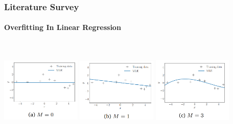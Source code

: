 \documentclass[handout,9pt]{beamer}
\numberwithin{theorem}{section}
\begin{document}
\begin{frame}
	\begin{spacing}{1}
		\frametitle{Literature Survey}
		\framesubtitle{Overfitting In Linear Regression}
		\includegraphics[width=3.8cm, height=5cm]{graph5} \includegraphics[width=3.8cm,height=5cm]{graph6} \includegraphics[width=3.8cm,height=5cm]{graph7}\\
		
	\end{spacing}
\end{frame}
\end{document}

